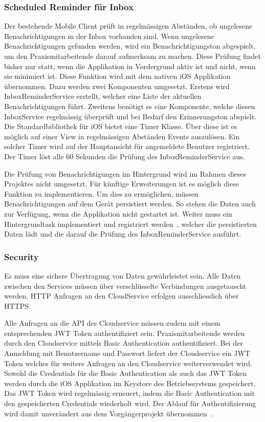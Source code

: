 \subsubsection{Scheduled Reminder für Inbox}

Der bestehende Mobile Client prüft in regelmässigen Abständen, ob ungelesene Benachrichtigungen in der Inbox vorhanden sind.
Wenn ungelesene Benachrichtigungen gefunden werden, wird ein Benachrichtigungston abgespielt, um den Praxismitarbeitende darauf aufmerksam zu machen.
Diese Prüfung findet bisher nur statt, wenn die Applikation in Vordergrund aktiv ist und nicht, wenn sie minimiert ist.
Diese Funktion wird mit dem nativen iOS Applikation übernommen.
Dazu werden zwei Komponenten umgesetzt.
Erstens wird InboxReminderService erstellt, welcher eine Liste der aktuellen Benachrichtigungen führt.
Zweitens benötigt es eine Komponente, welche diesen InboxService regelmässig überprüft und bei Bedarf den Erinnerungston abspielt.
Die Standardbibliothek für iOS bietet eine Timer Klasse.
Über diese ist es möglich auf einer View in regelmässigen Abständen Events auszulösen.\cite{ios_timer}
Ein solcher Timer wird auf der Hauptansicht für angemeldete Benutzer registriert.
Der Timer löst alle 60 Sekunden die Prüfung des InboxReminderService aus.

Die Prüfung von Benachrichtigungen im Hintergrund wird im Rahmen dieses Projektes nicht umgesetzt.
Für künftige Erweiterungen ist es möglich diese Funktion zu implementieren.
Um dies zu ermöglichen, müssen Benachrichtigungen auf dem Gerät persistiert werden.
So stehen die Daten auch zur Verfügung, wenn die Applikation nicht gestartet ist.
Weiter muss ein Hintergrundtask implementiert und registriert werden~\cite{ios_bgtaskscheduler}, welcher die persistierten Daten lädt und die darauf die Prüfung des InboxReminderService ausführt.

\subsubsection{Security}

Es muss eine sichere Übertragung von Daten gewährleistet sein.
Alle Daten zwischen den Services müssen über verschlüsselte Verbindungen ausgetauscht werden.
HTTP Anfragen an den CloudService erfolgen ausschliesslich über HTTPS.

Alle Anfragen an die API des Cloudservice müssen zudem mit einem entsprechenden JWT Token authentifiziert sein.
Praxismitarbeitende werden durch den Cloudservice mittels Basic Authentication authentifiziert.
Bei der Anmeldung mit Benutzername und Passwort liefert der Cloudservice ein JWT Token welches für weitere Anfragen an den Cloudservice weiterverwendet wird.
Sowohl die Credentials für die Basic Authentication als auch das JWT Token werden durch die iOS Applikation im Keystore des Betriebssystems gespeichert.
Das JWT Token wird regelmässig erneuert, indem die Basic Authentication mit den gespeicherten Credentials wiederholt wird.
Der Ablauf für Authentifizierung wird damit unverändert aus dem Vorgängerprojekt übernommen~\cite{ip5}.


